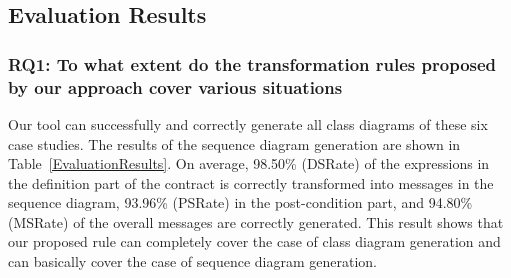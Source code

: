 \documentclass[pdflatex,sn-mathphys-num]{sn-jnl}%
\theoremstyle{thmstyleone}%
\theoremstyle{thmstyletwo}%
\theoremstyle{thmstylethree}%
\begin{document}
\subsection{Evaluation Results}
\subsubsection{\textbf{RQ1:} To what extent do the transformation rules proposed by our approach cover various situations}
\par Our tool can successfully and correctly generate all class diagrams of these six case studies. The results of the sequence diagram generation are shown in Table~\ref{EvaluationResults}. On average, 98.50\% (DSRate) of the expressions in the definition part of the contract is correctly transformed into messages in the sequence diagram, 93.96\% (PSRate) in the post-condition part, and 94.80\% (MSRate) of the overall messages are correctly generated. This result shows that our proposed rule can completely cover the case of class diagram generation and can basically cover the case of sequence diagram generation.
\end{document}
